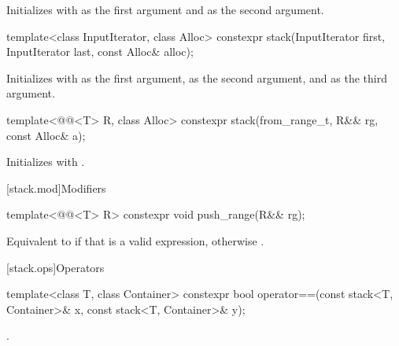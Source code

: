 \begin{itemdescr}
\pnum
\effects
Initializes  with  as the first argument and 
as the second argument.
\end{itemdescr}

%
\begin{itemdecl}
template<class InputIterator, class Alloc>
  constexpr stack(InputIterator first, InputIterator last, const Alloc& alloc);
\end{itemdecl}

\begin{itemdescr}
\pnum
\effects
Initializes  with
 as the first argument,
 as the second argument, and
 as the third argument.
\end{itemdescr}

%
\begin{itemdecl}
template<@@<T> R, class Alloc>
  constexpr stack(from_range_t, R&& rg, const Alloc& a);
\end{itemdecl}

\begin{itemdescr}
\pnum
\effects
Initializes
 with .
\end{itemdescr}

[stack.mod]{Modifiers}

%
\begin{itemdecl}
template<@@<T> R>
  constexpr void push_range(R&& rg);
\end{itemdecl}

\begin{itemdescr}
\pnum
\effects
Equivalent to 
if that is a valid expression,
otherwise .
\end{itemdescr}

[stack.ops]{Operators}

%
\begin{itemdecl}
template<class T, class Container>
  constexpr bool operator==(const stack<T, Container>& x, const stack<T, Container>& y);
\end{itemdecl}

\begin{itemdescr}
\pnum
\returns
{}.
\end{itemdescr}

